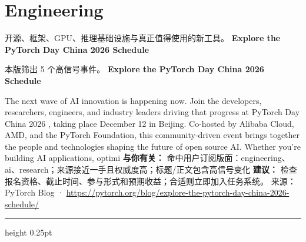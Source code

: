 \documentclass[10.5pt]{ctexart}
\begin{document}
\section*{Engineering}
{\color{ormuted} 开源、框架、GPU、推理基础设施与真正值得使用的新工具。}
\vspace{2mm}
{\LARGE\bfseries Explore the PyTorch Day China 2026 Schedule}\par
\vspace{1mm}
{\color{ormuted} 本版筛出 5 个高信号事件。}
\vspace{3mm}
{\Large\bfseries Explore the PyTorch Day China 2026 Schedule}\par
The next wave of AI innovation is happening now. Join the developers, researchers, engineers, and industry leaders driving that progress at PyTorch Day China 2026 , taking place December 12 in Beijing. Co-hosted by Alibaba Cloud, AMD, and the PyTorch Foundation, this community-driven event brings together the people and technologies shaping the future of open source AI. Whether you’re building AI applications, optimi
\textbf{与你有关：} 命中用户订阅版面：engineering、ai、research；来源接近一手且权威度高；标题/正文包含高信号变化
\textbf{建议：} 检查报名资格、截止时间、参与形式和预期收益；合适则立即加入任务系统。
{\footnotesize\color{ormuted} 来源：PyTorch Blog · \url{https://pytorch.org/blog/explore-the-pytorch-day-china-2026-schedule/}}
\vspace{4mm}
\hrule height 0.25pt
\vspace{3mm}
\end{document}
